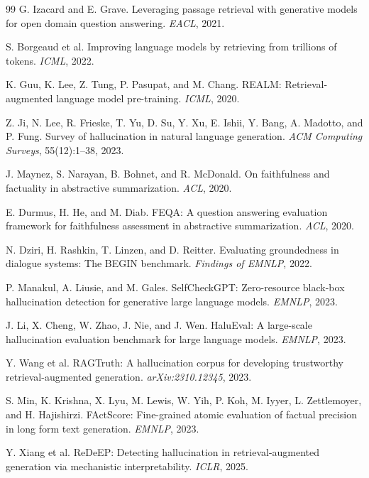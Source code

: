\documentclass[11pt]{article}
\begin{document}
\begin{thebibliography}{99}
G. Izacard and E. Grave. Leveraging passage retrieval with generative models for open domain question answering. \textit{EACL}, 2021.

S. Borgeaud et al. Improving language models by retrieving from trillions of tokens. \textit{ICML}, 2022.

K. Guu, K. Lee, Z. Tung, P. Pasupat, and M. Chang. REALM: Retrieval-augmented language model pre-training. \textit{ICML}, 2020.

Z. Ji, N. Lee, R. Frieske, T. Yu, D. Su, Y. Xu, E. Ishii, Y. Bang, A. Madotto, and P. Fung. Survey of hallucination in natural language generation. \textit{ACM Computing Surveys}, 55(12):1--38, 2023.

J. Maynez, S. Narayan, B. Bohnet, and R. McDonald. On faithfulness and factuality in abstractive summarization. \textit{ACL}, 2020.

E. Durmus, H. He, and M. Diab. FEQA: A question answering evaluation framework for faithfulness assessment in abstractive summarization. \textit{ACL}, 2020.

N. Dziri, H. Rashkin, T. Linzen, and D. Reitter. Evaluating groundedness in dialogue systems: The BEGIN benchmark. \textit{Findings of EMNLP}, 2022.

P. Manakul, A. Liusie, and M. Gales. SelfCheckGPT: Zero-resource black-box hallucination detection for generative large language models. \textit{EMNLP}, 2023.

J. Li, X. Cheng, W. Zhao, J. Nie, and J. Wen. HaluEval: A large-scale hallucination evaluation benchmark for large language models. \textit{EMNLP}, 2023.

Y. Wang et al. RAGTruth: A hallucination corpus for developing trustworthy retrieval-augmented generation. \textit{arXiv:2310.12345}, 2023.

S. Min, K. Krishna, X. Lyu, M. Lewis, W. Yih, P. Koh, M. Iyyer, L. Zettlemoyer, and H. Hajishirzi. FActScore: Fine-grained atomic evaluation of factual precision in long form text generation. \textit{EMNLP}, 2023.

Y. Xiang et al. ReDeEP: Detecting hallucination in retrieval-augmented generation via mechanistic interpretability. \textit{ICLR}, 2025.


\end{thebibliography}
\end{document}
